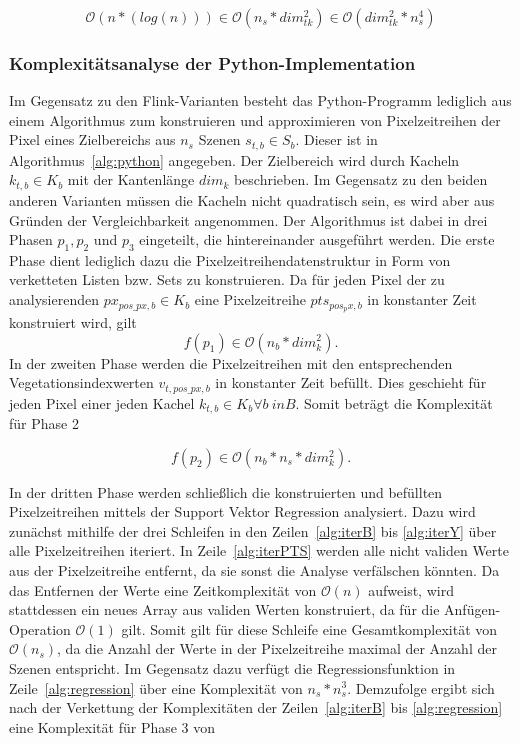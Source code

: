 \begin{equation} \label{eq:complexityFlinkComb}
\mathcal{O}(n*(log(n))) \in \mathcal{O}(n_s * dim_{tk}^2) \in \mathcal{O}(dim_{tk}^2 * n_s^4)
\end{equation}

\subsubsection{Komplexitätsanalyse der Python-Implementation}
Im Gegensatz zu den Flink-Varianten besteht das Python-Programm lediglich aus einem Algorithmus zum konstruieren und approximieren von Pixelzeitreihen der Pixel eines Zielbereichs aus $n_s$ Szenen $s_{t, b} \in S_b$. Dieser ist in Algorithmus~\ref{alg:python} angegeben. Der Zielbereich wird durch Kacheln $k_{t, b} \in K_{b}$ mit der Kantenlänge $dim_k$ beschrieben. Im Gegensatz zu den beiden anderen Varianten müssen die Kacheln nicht quadratisch sein, es wird aber aus Gründen der Vergleichbarkeit angenommen. Der Algorithmus ist dabei in drei Phasen $p_1, p_2$ und $p_3$ eingeteilt, die hintereinander ausgeführt werden. Die erste Phase dient lediglich dazu die Pixelzeitreihendatenstruktur in Form von verketteten Listen bzw. Sets zu konstruieren. Da für jeden Pixel der zu analysierenden $px_{pos\_px, b} \in K_{b}$ eine Pixelzeitreihe $pts_{pos_px, b}$ in konstanter Zeit konstruiert wird, gilt  
%
\begin{equation} \label{eq:complexityPython1}
f(p_1) \in \mathcal{O}(n_b * dim_k^2).
\end{equation}
%
In der zweiten Phase werden die Pixelzeitreihen mit den entsprechenden Vegetationsindexwerten $v_{t, pos\_px, b}$ in konstanter Zeit befüllt. Dies geschieht für jeden Pixel einer jeden Kachel $k_{t, b} \in K_b \forall b\ in B$. Somit beträgt die Komplexität für Phase 2 
 
\begin{equation} \label{eq:complexityPython2}
f(p_2) \in \mathcal{O}(n_b * n_s * dim_k^2).
\end{equation}
 
In der dritten Phase werden schließlich die konstruierten und befüllten Pixelzeitreihen mittels der Support Vektor Regression analysiert. Dazu wird zunächst mithilfe der drei Schleifen in den Zeilen~\ref{alg:iterB} bis \ref{alg:iterY} über alle Pixelzeitreihen iteriert. In Zeile~\ref{alg:iterPTS} werden alle nicht validen Werte aus der Pixelzeitreihe entfernt, da sie sonst die Analyse verfälschen könnten. Da das Entfernen der Werte eine Zeitkomplexität von $\mathcal{O}(n)$ aufweist, wird stattdessen ein neues Array aus validen Werten konstruiert, da für die Anfügen-Operation $\mathcal{O}(1)$ gilt. Somit gilt für diese Schleife eine Gesamtkomplexität von $\mathcal{O}(n_s)$, da die Anzahl der Werte in der Pixelzeitreihe maximal der Anzahl der Szenen entspricht. Im Gegensatz dazu verfügt die Regressionsfunktion in Zeile~\ref{alg:regression} über eine Komplexität von $n_s * n_s^3$. Demzufolge ergibt sich nach der Verkettung der Komplexitäten der Zeilen~\ref{alg:iterB} bis \ref{alg:regression} eine Komplexität für Phase 3 von 

